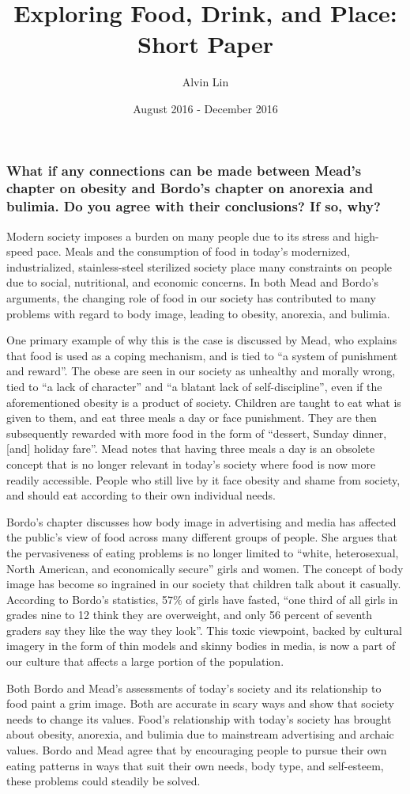 \documentclass[letterpaper, 12pt]{article}
\title{Exploring Food, Drink, and Place: Short Paper}
\author{Alvin Lin}
\date{August 2016 - December 2016}
\begin{document}
\maketitle

\subsubsection*{What if any connections can be made between Mead's chapter on
obesity and Bordo's chapter on anorexia and bulimia. Do you agree with their conclusions? If so, why?}

Modern society imposes a burden on many people due to its stress and high-speed
pace. Meals and the consumption of food in today's modernized, industrialized,
stainless-steel sterilized society place many constraints on people due to
social, nutritional, and economic concerns. In both Mead and Bordo's arguments,
the changing role of food in our society has contributed to many problems
with regard to body image, leading to obesity, anorexia, and bulimia. \par
One primary example of why this is the case is discussed by Mead, who explains
that food is used as a coping mechanism, and is tied to ``a system of punishment
and reward''. The obese are seen in our society as unhealthy and morally wrong,
tied to ``a lack of character'' and ``a blatant lack of self-discipline'', even
if the aforementioned obesity is a product of society. Children are taught to
eat what is given to them, and eat three meals a day or face punishment. They
are then subsequently rewarded with more food in the form of ``dessert, Sunday
dinner, [and] holiday fare''. Mead notes that having three meals a day is an
obsolete concept that is no longer relevant in today's society where food is
now more readily accessible. People who still live by it face obesity and shame
from society, and should eat according to their own individual needs. \par
Bordo's chapter discusses how body image in advertising and media has affected
the public's view of food across many different groups of people. She argues
that the pervasiveness of eating problems is no longer limited to ``white,
heterosexual, North American, and economically secure'' girls and women. The
concept of body image has become so ingrained in our society that children
talk about it casually. According to Bordo's statistics, 57\% of girls have
fasted, ``one third of all girls in grades nine to 12 think they are overweight,
and only 56 percent of seventh graders say they like the way they look''. This
toxic viewpoint, backed by cultural imagery in the form of thin models and
skinny bodies in media, is now a part of our culture that affects a large
portion of the population. \par
Both Bordo and Mead's assessments of today's society and its relationship to
food paint a grim image. Both are accurate in scary ways and show that society
needs to change its values. Food's relationship with today's society has
brought about obesity, anorexia, and bulimia due to mainstream advertising and
archaic values. Bordo and Mead agree that by encouraging people to pursue their
own eating patterns in ways that suit their own needs, body type, and
self-esteem, these problems could steadily be solved.
\end{document}

